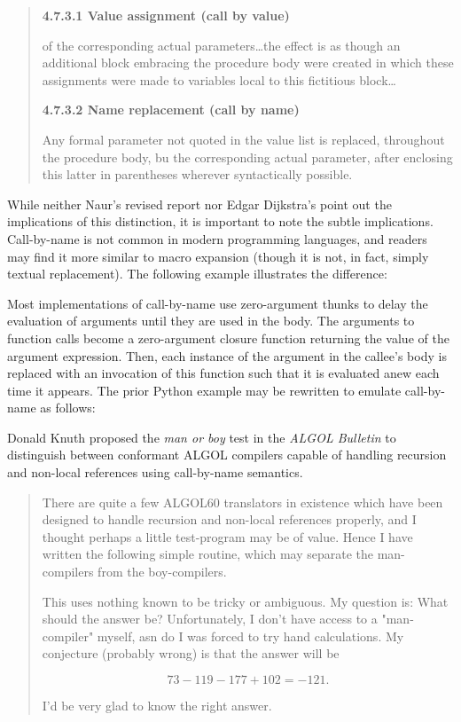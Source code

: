 \begin{quotation}
\noindent
\textbf{4.7.3.1 Value assignment (call by value)}

of the corresponding actual parameters\dots the effect is as though an 
additional block embracing the procedure body were created in which these 
assignments were made to variables local to this fictitious block\dots

\noindent
\textbf{4.7.3.2 Name replacement (call by name)}

Any formal parameter not quoted in the value list is replaced, throughout the 
procedure body, bu the corresponding actual parameter, after enclosing this 
latter in parentheses wherever syntactically possible.
\end{quotation}

While neither Naur's revised report nor Edgar Dijkstra's
point out the implications of this distinction, it is important to note
the subtle implications.
Call-by-name is not common in modern programming languages, and readers
may find it more similar to macro expansion
(though it is not, in fact, simply textual replacement).
The following example illustrates the difference:



Most implementations of call-by-name use zero-argument thunks to delay
the evaluation of arguments until they are used in the body.
The arguments to function calls become a zero-argument closure function
returning the value of the argument expression.
Then, each instance of the argument in the callee's body is replaced
with an invocation of this function such that it is evaluated anew
each time it appears.
The prior Python example may be rewritten to emulate call-by-name as follows:



Donald Knuth proposed the \textit{man or boy} test in the \textit{ALGOL Bulletin}
to distinguish between
conformant ALGOL compilers capable of handling recursion and non-local references
using call-by-name semantics\cite{Knuth1964ManOrBoy}.

\begin{quotation}
There are quite a few ALGOL60 translators in existence which have been designed 
to handle recursion and non-local references properly, and I thought perhaps a 
little test-program may be of value. Hence I have written the following simple 
routine, which may separate the man-compilers from the boy-compilers.

This uses nothing known to be tricky or ambiguous. My question is: What should 
the answer be? Unfortunately, I don't have access to a "man-compiler" myself, 
asn do I was forced to try hand calculations. My conjecture (probably wrong) is 
that the answer will be

\[
73 - 119 - 177 + 102 = -121 .
\]

I'd be very glad to know the right answer.
\end{quotation}

